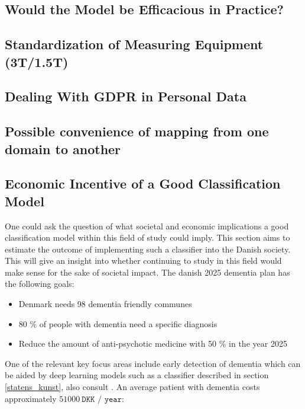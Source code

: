 \documentclass[12pt, fleqn, titlepage]{article}
\newcommand{\1}[1]{\mathds{1}\left[#1\right]}
\begin{document}
\subsection{Would the Model be Efficacious in Practice?}

\subsection{Standardization of Measuring Equipment (3T/1.5T)}

\subsection{Dealing With GDPR in Personal Data}

\subsection{Possible convenience of mapping from one domain to another }


\subsection{Economic Incentive of a Good Classification Model}

One could ask the question of what societal and economic implications a good classification model within this field of study could imply. This section aims to estimate the outcome of implementing such a classifier into the Danish society. This will give an insight into whether continuing to study in this field would make sense for the sake of societal impact. The danish 2025 dementia plan has the following goals:

\begin{itemize}
	\item Denmark needs 98 dementia friendly communes
	\item 80 \% of people with dementia need a specific diagnosis 
	\item Reduce the amount of anti-psychotic medicine with 50 \% in the year 2025
\end{itemize}
\noindent
One of the relevant key focus areas include early detection of dementia which can be aided by deep learning models such as a classifier described in section \ref{statens_kunst}, also consult \cite{yudong, suk_and_shen_1, suk_and_shen_2, cheng, neuro}. An average patient with dementia costs approximately $ 51000 \ \texttt{DKK / year}$:
\end{document}
